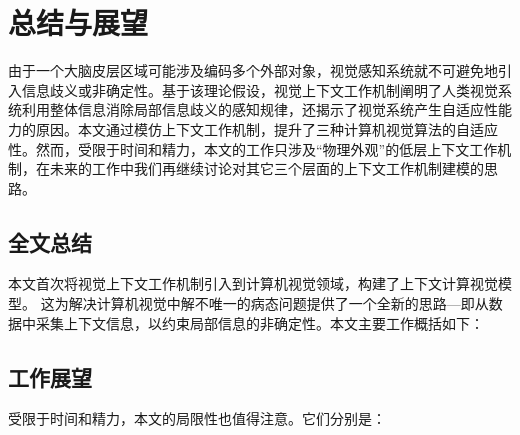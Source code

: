 \chapter{总结与展望}
\label{c7}

由于一个大脑皮层区域可能涉及编码多个外部对象，视觉感知系统就不可避免地引入信息歧义或非确定性。基于该理论假设，视觉上下文工作机制阐明了人类视觉系统利用整体信息消除局部信息歧义的感知规律，还揭示了视觉系统产生自适应性能力的原因。本文通过模仿上下文工作机制，提升了三种计算机视觉算法的自适应性。然而，受限于时间和精力，本文的工作只涉及“物理外观”的低层上下文工作机制，在未来的工作中我们再继续讨论对其它三个层面的上下文工作机制建模的思路。



\section{全文总结} 
\label{c7:s1}

本文首次将视觉上下文工作机制引入到计算机视觉领域，构建了上下文计算视觉模型。 这为解决计算机视觉中解不唯一的病态问题提供了一个全新的思路---即从数据中采集上下文信息，以约束局部信息的非确定性。本文主要工作概括如下：



\section{工作展望} 
\label{c7:s2}

受限于时间和精力，本文的局限性也值得注意。它们分别是：



